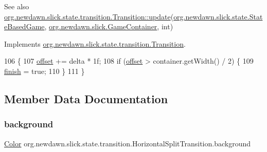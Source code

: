 \begin{DoxySeeAlso}{See also}
\mbox{\hyperlink{interfaceorg_1_1newdawn_1_1slick_1_1state_1_1transition_1_1_transition_a9be3072f6e2423e3d0a451a419d1d518}{org.\+newdawn.\+slick.\+state.\+transition.\+Transition\+::update}}(\mbox{\hyperlink{classorg_1_1newdawn_1_1slick_1_1state_1_1_state_based_game}{org.\+newdawn.\+slick.\+state.\+State\+Based\+Game}}, \mbox{\hyperlink{classorg_1_1newdawn_1_1slick_1_1_game_container}{org.\+newdawn.\+slick.\+Game\+Container}}, int) 
\end{DoxySeeAlso}


Implements \mbox{\hyperlink{interfaceorg_1_1newdawn_1_1slick_1_1state_1_1transition_1_1_transition_a9be3072f6e2423e3d0a451a419d1d518}{org.\+newdawn.\+slick.\+state.\+transition.\+Transition}}.


\begin{DoxyCode}
106                                   \{
107         \mbox{\hyperlink{classorg_1_1newdawn_1_1slick_1_1state_1_1transition_1_1_horizontal_split_transition_a7abff0f1ccb7041c5a0964ee3f06abec}{offset}} += delta * 1f;
108         \textcolor{keywordflow}{if} (\mbox{\hyperlink{classorg_1_1newdawn_1_1slick_1_1state_1_1transition_1_1_horizontal_split_transition_a7abff0f1ccb7041c5a0964ee3f06abec}{offset}} > container.getWidth() / 2) \{
109             \mbox{\hyperlink{classorg_1_1newdawn_1_1slick_1_1state_1_1transition_1_1_horizontal_split_transition_a87c270ce19c400ee49306ba1c1fc9e63}{finish}} = \textcolor{keyword}{true};
110         \}
111     \}
\end{DoxyCode}


\subsection{Member Data Documentation}
\mbox{\label{classorg_1_1newdawn_1_1slick_1_1state_1_1transition_1_1_horizontal_split_transition_a9f2e988c706773e93ad1472d85c5b229}} 
\subsubsection{\texorpdfstring{background}{background}}
{\footnotesize\ttfamily \mbox{\hyperlink{classorg_1_1newdawn_1_1slick_1_1_color}{Color}} org.\+newdawn.\+slick.\+state.\+transition.\+Horizontal\+Split\+Transition.\+background\hspace{0.3cm}{\ttfamily [private]}}

